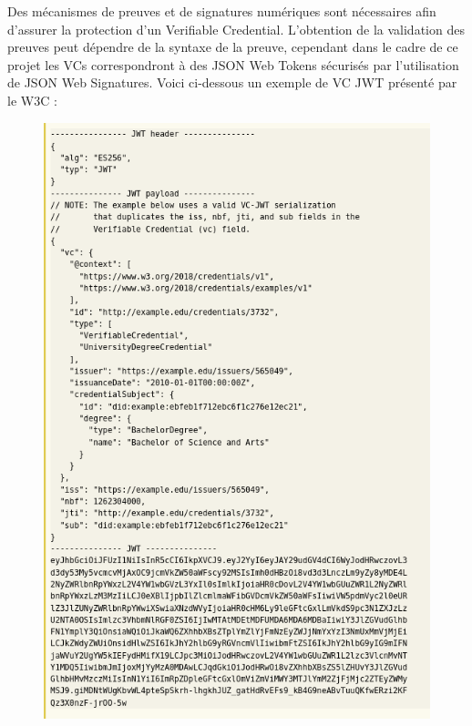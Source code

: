 \documentclass[12pt, openany]{report}
\begin{document}
\begin{flushleft}
Des mécanismes de preuves et de signatures numériques sont nécessaires afin d'assurer la protection d'un Verifiable Credential. L'obtention de la validation des preuves peut dépendre de la syntaxe de la preuve, cependant dans le cadre de ce projet les VCs correspondront à des JSON Web Tokens sécurisés par l'utilisation de JSON Web Signatures. Voici ci-dessous un exemple de VC JWT présenté par le W3C :\\
\begin{figure}[h]
\includegraphics[scale=0.4]{vc2.png}
\centering
\end{figure}

\end{flushleft}

\newpage
\end{document}
